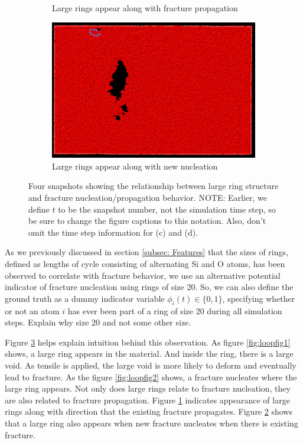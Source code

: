 \begin{figure}
\begin{subfigure}{.5\textwidth}
      \caption{Large rings appear along with fracture propagation}
      \label{fig:loopfig3}
    \end{subfigure}
    \begin{subfigure}{.5\textwidth}
      \centering
      \includegraphics[width=.8\linewidth]{images/fp1_propa2.png}
      \caption{Large rings appear along with new nucleation}
      \label{fig:loopfig4}
    \end{subfigure}
    
    \caption{Four snapshots showing the relationship between large ring structure and fracture nucleation/propagation behavior.  {\color{red}NOTE: Earlier, we define $t$ to be the snapshot number, not the simulation time step, so be sure to change the figure captions to this notation.  Also, don't omit the time step information for (c) and (d).}}
    \label{fig:loopfig}
    \end{figure}
    
    As we previously discussed in section \ref{subsec: Features} that the sizes of rings, defined as lengths of cycle consisting of alternating Si and O atoms, has been observed to correlate with fracture behavior, we use an alternative potential indicator of fracture nucleation using rings of size 20. So, we can also define the ground truth as a dummy indicator variable $\phi_i(t) \in\{0,1\}$, specifying whether or not an atom $i$ has ever been part of a ring of size 20 during all simulation steps. {\color{red}Explain why size 20 and not some other size.}
    
    Figure \ref{fig:loopfig} helps explain intuition behind this observation. As figure \ref{fig:loopfig1} shows, a large ring appears in the material. And inside the ring, there is a large void. As tensile is applied, the large void is more likely to deform and eventually lead to fracture. As the figure \ref{fig:loopfig2} shows, a fracture nucleates where the large ring appears. Not only does large rings relate to fracture nucleation, they are also related to fracture propagation. Figure \ref{fig:loopfig3} indicates appearance of large rings along with direction that the existing fracture propagates. Figure \ref{fig:loopfig4} shows that a large ring also appears when new fracture nucleates when there is existing fracture.

